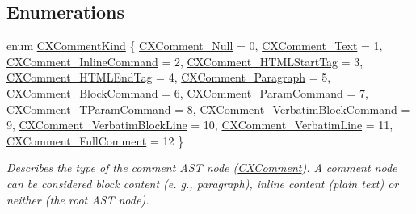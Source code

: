 \subsection*{Enumerations}
\begin{DoxyCompactItemize}
\item 
enum \hyperlink{group__CINDEX__COMMENT_ga3c336d80551401fde394b84aa5651221}{C\+X\+Comment\+Kind} \{ \newline
\hyperlink{group__CINDEX__COMMENT_gga3c336d80551401fde394b84aa5651221a4c161a2e9ceb68e886a4200bc1ff1102}{C\+X\+Comment\+\_\+\+Null} = 0, 
\hyperlink{group__CINDEX__COMMENT_gga3c336d80551401fde394b84aa5651221a14989e202e072cc4036fbc5b2e154fe1}{C\+X\+Comment\+\_\+\+Text} = 1, 
\hyperlink{group__CINDEX__COMMENT_gga3c336d80551401fde394b84aa5651221af38c7e8ed99b72504cf6a2f89a6c9212}{C\+X\+Comment\+\_\+\+Inline\+Command} = 2, 
\hyperlink{group__CINDEX__COMMENT_gga3c336d80551401fde394b84aa5651221af266668eef41546725c4a5468f157bfe}{C\+X\+Comment\+\_\+\+H\+T\+M\+L\+Start\+Tag} = 3, 
\newline
\hyperlink{group__CINDEX__COMMENT_gga3c336d80551401fde394b84aa5651221a4b0d964d2cbee7ec5be119b8d4911f85}{C\+X\+Comment\+\_\+\+H\+T\+M\+L\+End\+Tag} = 4, 
\hyperlink{group__CINDEX__COMMENT_gga3c336d80551401fde394b84aa5651221aa9b0c8f429c7eb69d7942a9d51bc02ed}{C\+X\+Comment\+\_\+\+Paragraph} = 5, 
\hyperlink{group__CINDEX__COMMENT_gga3c336d80551401fde394b84aa5651221ad31c09bcc3d5e8db68d4f75e6abe8a73}{C\+X\+Comment\+\_\+\+Block\+Command} = 6, 
\hyperlink{group__CINDEX__COMMENT_gga3c336d80551401fde394b84aa5651221aa56a1789afc036fcb85cd6a906caf3f6}{C\+X\+Comment\+\_\+\+Param\+Command} = 7, 
\newline
\hyperlink{group__CINDEX__COMMENT_gga3c336d80551401fde394b84aa5651221ac5e11e85e1a265b9de9a494168ffc3f0}{C\+X\+Comment\+\_\+\+T\+Param\+Command} = 8, 
\hyperlink{group__CINDEX__COMMENT_gga3c336d80551401fde394b84aa5651221ad8536afabadf2bbe0dac69c1b4261cd1}{C\+X\+Comment\+\_\+\+Verbatim\+Block\+Command} = 9, 
\hyperlink{group__CINDEX__COMMENT_gga3c336d80551401fde394b84aa5651221aa1d4e0983dba3fad5b33af95524ab486}{C\+X\+Comment\+\_\+\+Verbatim\+Block\+Line} = 10, 
\hyperlink{group__CINDEX__COMMENT_gga3c336d80551401fde394b84aa5651221af8bbe87a5d0d110c211efdb3c340bf8c}{C\+X\+Comment\+\_\+\+Verbatim\+Line} = 11, 
\newline
\hyperlink{group__CINDEX__COMMENT_gga3c336d80551401fde394b84aa5651221a959bdb92ff045c50926b6fb5761a2518}{C\+X\+Comment\+\_\+\+Full\+Comment} = 12
 \}\begin{DoxyCompactList}\small\item\em Describes the type of the comment A\+ST node ({\ttfamily \hyperlink{structCXComment}{C\+X\+Comment}}). A comment node can be considered block content (e. g., paragraph), inline content (plain text) or neither (the root A\+ST node). \end{DoxyCompactList}

\end{DoxyCompactItemize}
